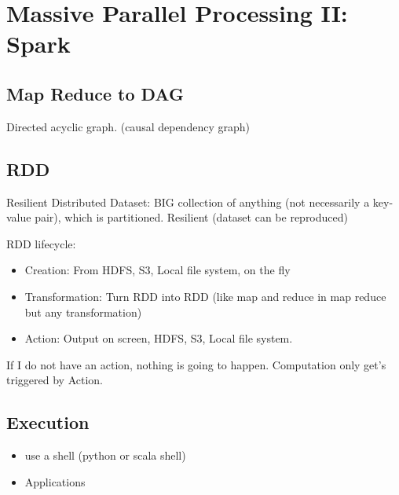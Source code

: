 \usepackage{textcomp}\section{Massive Parallel Processing II: Spark}


\subsection{Map Reduce to DAG}
Directed acyclic graph. (causal dependency graph)

\subsection{RDD}
Resilient Distributed Dataset: BIG collection of anything (not necessarily a key-value pair), which is partitioned.
Resilient (dataset can be reproduced)

RDD lifecycle:
\begin{itemize}
    \item Creation: From HDFS, S3, Local file system, on the fly
    \item Transformation: Turn RDD into RDD (like map and reduce in map reduce but any transformation)
    \item Action: Output on screen, HDFS, S3, Local file system.
\end{itemize}
If I do not have an action, nothing is going to happen. Computation only get's triggered by Action.

\subsection{Execution}
\begin{itemize}
    \item use a shell (python or scala shell)
    \item Applications
\end{itemize}

